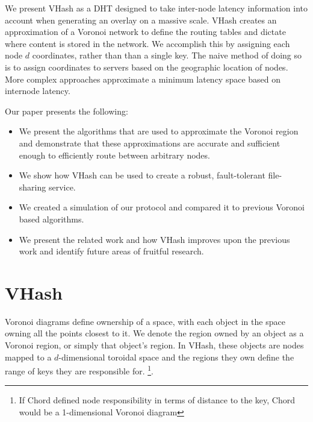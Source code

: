 \documentclass{IEEEtran}
\begin{document}
We present VHash as a DHT designed to take inter-node latency information into account when generating an overlay on a massive scale.  VHash creates an approximation of a Voronoi network to define the routing tables and dictate where content is stored in the network.  We accomplish this by assigning each node $d$ coordinates, rather than than a single key.  The naive method of doing so is to assign coordinates to servers based on the geographic location of nodes. More complex approaches approximate a minimum latency space based on internode latency.



 

Our paper presents the following:
\begin{itemize}
	\item We present the algorithms that are used to approximate the Voronoi region and demonstrate that these approximations are accurate and sufficient enough to efficiently route between arbitrary nodes.
	\item We show how VHash can be used to create a robust, fault-tolerant file-sharing service.
	\item We created a simulation of our protocol and compared it to previous Voronoi based algorithms.
	\item We present the related work and how VHash improves upon the previous work and identify future areas of fruitful research.
\end{itemize}


\section{VHash}
Voronoi diagrams define ownership of a space, with each object in the space owning all the points closest to it.  We denote the region owned by an object as a Voronoi region, or simply that object's region.  In VHash, these objects are nodes mapped to a $d$-dimensional toroidal space and the regions they own define the range of keys they are responsible for.  \footnote{If Chord defined node responsibility in terms of distance to the key, Chord would be a 1-dimensional Voronoi diagram}.  
\end{document}
